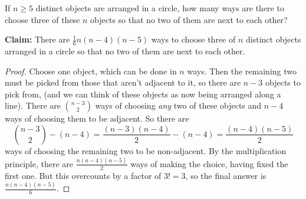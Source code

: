 \documentclass[11pt,dvipsnames]{book}
\numberwithin{figure}{section} %
\numberwithin{table}{section} %
\begin{document}
\begin{exercise} If $n\geq 5$ distinct objects are arranged in a circle, how many ways are there to choose three of these $n$ objects so that no two of them are next to each other?

\begin{solution}
{\bf Claim:}
There are $\frac{1}{6}n(n-4)(n-5)$ ways to choose three of $n$ distinct objects arranged in a circle so that no two of them are next to each other.

\begin{proof}
Choose one object, which can be done in $n$ ways. Then the remaining two must be picked from those that aren't adjacent to it, so there are $n-3$ objects to pick from, (and we can think of these objects as now being arranged along a line). There are ${{n-3} \choose 2}$ ways of choosing {\em any} two of these objects and
$n-4$ ways of choosing them to be adjacent. So there are
$${{n-3} \choose 2} - (n-4) = \frac{(n-3)(n-4)}{2} - (n-4) = \frac{(n-4)(n-5)}{2}$$
ways of choosing the remaining two to be non-adjacent. By the multiplication principle, there are $\frac{n(n-4)(n-5)}{2}$ ways of making the choice, having fixed the first one. But this overcounts by a factor of $3! = 3$, so the final answer is $\frac{n(n-4)(n-5)}{6}$.
\end{proof}

\end{solution}
\end{exercise}

%
%
%
\end{document}
